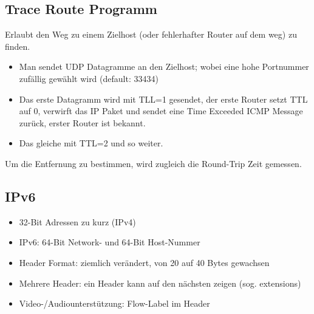 \subsection*{Trace Route Programm}

Erlaubt den Weg zu einem Zielhost (oder fehlerhafter Router auf dem
weg) zu finden.
\begin{itemize}
\item Man sendet UDP Datagramme an den Zielhost; wobei eine hohe Portnummer
zufällig gewählt wird (default: 33434)
\item Das erste Datagramm wird mit TLL=1 gesendet, der erste Router setzt
TTL auf 0, verwirft das IP Paket und sendet eine Time Exceeded ICMP
Message zurück, erster Router ist bekannt.
\item Das gleiche mit TTL=2 und so weiter.
\end{itemize}
Um die Entfernung zu bestimmen, wird zugleich die Round-Trip Zeit
gemessen.


\subsection*{IPv6}
\begin{itemize}
\item 32-Bit Adressen zu kurz (IPv4)
\item IPv6: 64-Bit Network- und 64-Bit Host-Nummer
\item Header Format: ziemlich verändert, von 20 auf 40 Bytes gewachsen
\item Mehrere Header: ein Header kann auf den nächsten zeigen (sog. extensions)
\item Video-/Audiounterstützung: Flow-Label im Header
\end{itemize}

